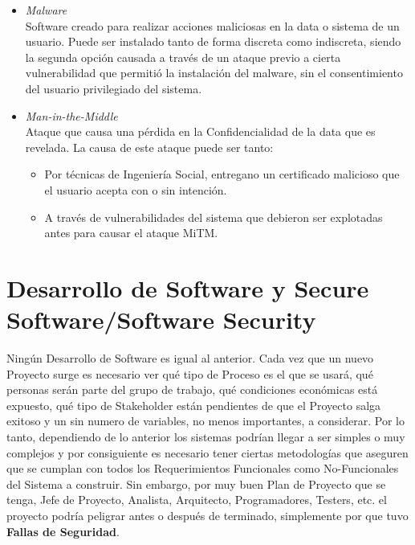 \begin{itemize}
	\item \textit{Malware}
		\\Software creado para realizar acciones maliciosas en la data o sistema de un usuario. Puede ser instalado tanto de forma discreta como indiscreta, siendo la segunda opción causada a través de un ataque previo a cierta vulnerabilidad que permitió la instalación del malware, sin el consentimiento del usuario privilegiado del sistema.
	\item \textit{Man-in-the-Middle}
		\\Ataque que causa una pérdida en la Confidencialidad de la data que es revelada. La causa de este ataque puede ser tanto:
			\begin{itemize}
				\item Por técnicas de Ingeniería Social, entregano un certificado malicioso que el usuario acepta con o sin intención.
				\item A través de vulnerabilidades del sistema que debieron ser explotadas antes para causar el ataque MiTM.
			\end{itemize}
\end{itemize}



\section{Desarrollo de Software y Secure Software/Software Security}
\label{chap:SD_SS}

Ningún Desarrollo de Software es igual al anterior. Cada vez que un nuevo Proyecto surge es necesario ver qué tipo de Proceso es el que se usará, qué personas serán parte del grupo de trabajo, qué condiciones económicas está expuesto, qué tipo de Stakeholder están pendientes de que el Proyecto salga exitoso y un sin numero de variables, no menos importantes, a considerar. Por lo tanto, dependiendo de lo anterior los sistemas podrían llegar a ser simples o muy complejos y por consiguiente es necesario tener ciertas metodologías que aseguren que se cumplan con todos los Requerimientos Funcionales como No-Funcionales del Sistema a construir. Sin embargo, por muy buen Plan de Proyecto que se tenga, Jefe de Proyecto, Analista, Arquitecto, Programadores, Testers, etc. el proyecto podría peligrar antes o después de terminado, simplemente por que tuvo \textbf{Fallas de Seguridad}.


